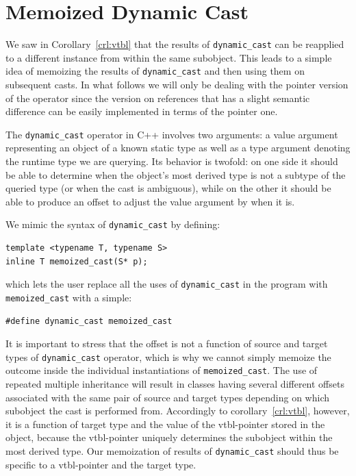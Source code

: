 \documentclass[preprint]{sigplanconf}
\makeatletter
\DeclareRobustCommand{\code}[1]{{\lstinline[breaklines=false,escapechar=@]{#1}}}
\makeatother
\begin{document}
\section{Memoized Dynamic Cast}
\label{sec:memcast}

We saw in Corollary~\ref{crl:vtbl} that the results of \code{dynamic_cast} can 
be reapplied to a different instance from within the same subobject. This leads 
to a simple idea of memoizing the results of \code{dynamic_cast} and then using 
them on subsequent casts. In what follows we will only be dealing with the  
pointer version of the operator since the version on references that has a 
slight semantic difference can be easily implemented in terms of the pointer one.

The \code{dynamic_cast} operator in C++ involves two arguments: a value argument 
representing an object of a known static type as well as a type argument 
denoting the runtime type we are querying. Its behavior is twofold: on one side 
it should be able to determine when the object's most derived type is not a 
subtype of the queried type (or when the cast is ambiguous), while on the other 
it should be able to produce an offset to adjust the value argument by when it is.

We mimic the syntax of \code{dynamic_cast} by defining:

\begin{lstlisting}
template <typename T, typename S>
inline T memoized_cast(S* p);
\end{lstlisting}

\noindent
which lets the user replace all the uses of \code{dynamic_cast} in the program 
with \code{memoized_cast} with a simple:

\begin{lstlisting}
#define dynamic_cast memoized_cast
\end{lstlisting}

\noindent
It is important to stress that the offset is not a function of source and target 
types of \code{dynamic_cast} operator, which is why we cannot simply memoize the 
outcome inside the individual instantiations of \code{memoized_cast}.
The use of repeated multiple inheritance will result in classes having several 
different offsets associated with the same pair of source and target types 
depending on which subobject the cast is performed from. Accordingly to 
corollary~\ref{crl:vtbl}, however, it is a function of target type and the value 
of the vtbl-pointer stored in the object, because the vtbl-pointer uniquely 
determines the subobject within the most derived type. Our memoization of 
results of \code{dynamic_cast} should thus be specific to a vtbl-pointer and the 
target type. 
\end{document}
